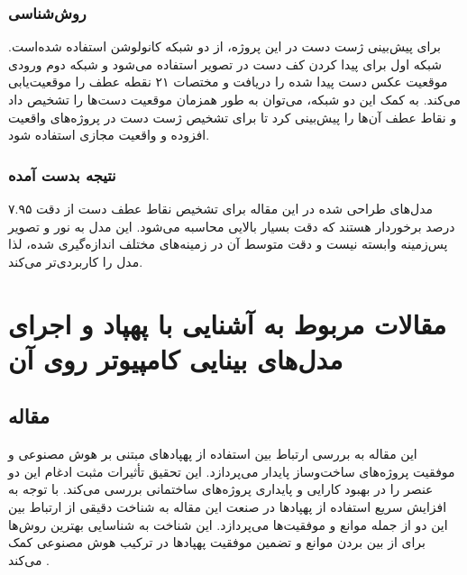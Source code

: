 \subsubsection{روش‌شناسی}
 برای پیش‌بینی ژست دست  در این پروژه، از دو شبکه کانولوشن استفاده شده‌است. شبکه اول برای پیدا کردن کف دست در تصویر استفاده می‌شود و شبکه دوم ورودی 
موقعیت عکس دست پیدا شده را دریافت و مختصات ۲۱ نقطه عطف را موقعیت‌یابی می‌کند. به کمک این دو شبکه، می‌توان به طور همزمان موقعیت دست‌ها را تشخیص داد و 
نقاط عطف آن‌ها را پیش‌بینی کرد تا برای تشخیص ژست دست در پروژه‌های واقعیت افزوده و واقعیت مجازی استفاده شود.

\subsubsection{نتیجه بدست آمده}
مدل‌های طراحی شده در این مقاله برای تشخیص نقاط عطف دست از دقت ۷.۹۵ درصد برخوردار هستند که دقت بسیار بالایی محاسبه می‌شود. این مدل به نور و تصویر پس‌زمینه 
وابسته نیست و دقت متوسط آن در زمینه‌های مختلف اندازه‌گیری شده، لذا مدل را کاربردی‌تر می‌کند.




\section{مقالات مربوط به آشنایی با پهپاد و اجرای مدل‌های بینایی کامپیوتر روی آن}

\subsection{مقاله }

این مقاله به بررسی ارتباط بین استفاده از پهپادهای مبتنی بر هوش مصنوعی و موفقیت پروژه‌های ساخت‌وساز پایدار می‌پردازد. این تحقیق تأثیرات مثبت ادغام
 این دو عنصر را در بهبود کارایی و پایداری پروژه‌های ساختمانی بررسی می‌کند. با توجه به افزایش سریع استفاده از پهپادها در صنعت این مقاله به شناخت دقیقی از ارتباط بین این دو از جمله موانع و موفقیت‌ها می‌پردازد. این شناخت به شناسایی بهترین روش‌ها برای از بین بردن موانع و تضمین موفقیت پهپادها در ترکیب هوش مصنوعی کمک می‌کند \cite{waqar2023modeling}.


